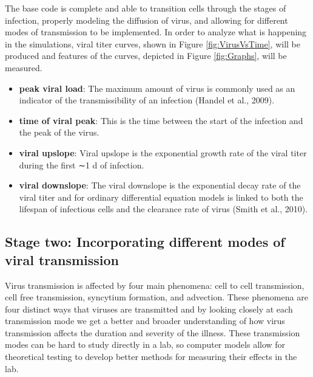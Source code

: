 \documentclass[a4paper]{article}
\begin{document}
The base code is complete and able to transition cells through the stages of infection, properly modeling the diffusion of virus, and allowing for different modes of transmission to be implemented. In order to analyze what is happening in the simulations, viral titer curves, shown in Figure \ref{fig:VirusVsTime}, will be produced and features of the curves, depicted in Figure \ref{fig:Graphs}, will be measured.
\begin{itemize}
    \item \textbf{peak viral load}: The maximum amount of virus is commonly used as an indicator of the transmissibility of an infection (Handel et al., 2009).
    \item \textbf{time of viral peak}: This is the time between the start of the infection and the peak of the virus.
    \item \textbf{viral upslope}: Viral upslope is the exponential growth rate of the viral titer during the first ∼1 d of infection.
    \item \textbf{viral downslope}: The viral downslope is the exponential decay rate of the viral titer and for ordinary differential equation models is linked to both the lifespan of infectious cells and the clearance rate of virus (Smith et al., 2010).
\end{itemize}

\subsection{Stage two: Incorporating different modes of viral transmission}
Virus transmission is affected by four main phenomena: cell to cell transmission, cell free transmission, syncytium formation, and advection. These phenomena are four distinct ways that viruses are transmitted and by looking closely at each transmission mode we get a better and broader understanding of how virus transmission affects the duration and severity of the illness. These transmission modes can be hard to study directly in a lab, so computer models allow for theoretical testing to develop better methods for measuring their effects in the lab.
\end{document}
